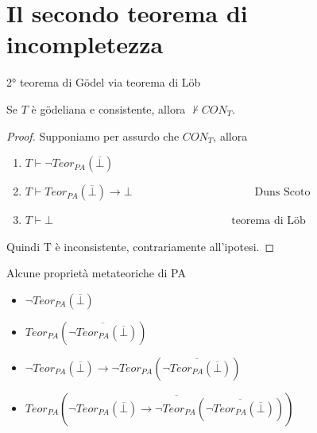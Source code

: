 \documentclass{beamer}
\begin{document}
\section{Il secondo teorema di incompletezza}
\begin{frame}{2° teorema di Gödel via teorema di Löb}
\begin{block}{}
    Se $T$ è gödeliana e consistente, allora $\not\vdash CON_T$.
\end{block}
\begin{proof}
    Supponiamo per assurdo che $CON_T$, allora
    \begin{enumerate}
        \item $T\vdash \neg Teor_{PA}(\overline{\bot})$
        \item $T\vdash Teor_{PA}(\overline{\bot}) \to \bot \quad\qquad\quad\quad\qquad\quad\quad\qquad\text{Duns Scoto}$
        \item $T\vdash \bot \quad\qquad\quad\quad\qquad\quad\quad\qquad\quad\quad\qquad\quad\text{teorema di Löb}$
    \end{enumerate}
    Quindi T è inconsistente, contrariamente all’ipotesi.
\end{proof}

\end{frame}



\begin{frame}{Alcune proprietà metateoriche di PA}
\begin{exampleblock}{}
    \begin{itemize}
        \item $\neg Teor_{PA}(\overline{\bot})$
        \item $Teor_{PA}(\overline{\neg Teor_{PA}(\overline{\bot})})$
        \item $\neg Teor_{PA}(\overline{\bot})\to \neg Teor_{PA}(\overline{\neg Teor_{PA}(\overline{\bot})})$
        \item $Teor_{PA}(\overline{\neg Teor_{PA}(\overline{\bot})\to \neg Teor_{PA}(\overline{\neg Teor_{PA}(\overline{\bot})})})$
    \end{itemize}
\end{exampleblock}

\end{frame}
\end{document}

